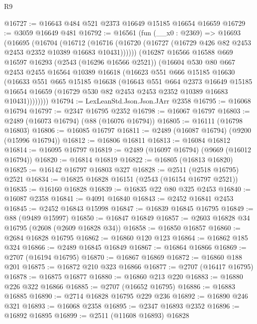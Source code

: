 \begin{lexlean}{R9}
\begin{coremodule}
@16727 := @16643 @484 @521 @2373 @16649 @15185 @16654 @16659
@16729 := @3059 @16649 @481
@16792 := @16561
    (fun (__x0 : @2369) =>
    @16693
      (@16695
        (@16704
          (@16712
            (@16716 (@16720 (@16727 (@16729 @426 @82 @2453 @2453 @2352 @10389 @16683 @10431))))))
        (@16287
          @16566
          @16588
          @669
          @16597
          @16293
          (@2543 (@16296 @16566 @2521))
          (@16604
            @530
            @80
            @667
            @2453
            @2455
            @16564
            @10389
            @16618
            (@16623
              @551
              @666
              @15185
              @16630
              (@16633
                @551
                @665
                @15185
                @16638
                (@16643
                  @551
                  @664
                  @2373
                  @16649
                  @15185
                  @16654
                  @16659
                  (@16729 @530 @82 @2453 @2453 @2352 @10389 @16683 @10431))))))))
@16794 := LexLeanStd.Json.Json.JArr @2358
@16795 := @16068 @16794
@16797 := @2347 @16795 @2352
@16798 := @16067 @16797
@16803 := @2489 (@16073 @16794) (@88 (@16076 @16794))
@16805 := @16111 (@16798 @16803)
@16806 := @16085 @16797
@16811 := @2489 (@16087 @16794) (@9200 (@15996 @16794))
@16812 := @16806 @16811
@16813 := @16084 @16812
@16814 := @16095 @16797
@16819 := @2489 (@16097 @16794) (@9669 (@16012 @16794))
@16820 := @16814 @16819
@16822 := @16805 (@16813 @16820)
@16825 := @16142 @16797 @16803 @327
@16828 := @2511 (@2518 @16795) @2521
@16834 := @16825 @16828 @16151 (@2543 (@16154 @16797 @2521))
@16835 := @16160 @16828
@16839 := @16835 @22 @80 @325 @2453
@16840 := @16087 @2358
@16841 := @4091 @16840
@16843 := @2452 @16841 @2453
@16845 := @2452 @16843 @15998
@16847 := @16839 @16845 @16795
@16849 := @88 (@9489 @15997)
@16850 := @16847 @16849
@16857 := @2603 @16828 @34 @16795 (@2608 (@2609 @16828 @34))
@16858 := @16850 @16857
@16860 := @2684 @16828 @16795
@16862 := @16860 @120 @123
@16864 := @16862 @185 @324
@16866 := @2489 @16845 @16849
@16867 := @16864 @16866
@16869 := @2707 (@16194 @16795)
@16870 := @16867 @16869
@16872 := @16860 @188 @201
@16875 := @16872 @210 @323 @16866
@16877 := @2707 (@16417 @16795)
@16878 := @16875 @16877
@16880 := @16860 @213 @220
@16883 := @16880 @226 @322 @16866
@16885 := @2707 (@16652 @16795)
@16886 := @16883 @16885
@16890 := @2714 @16828 @16795 @229 @236
@16892 := @16890 @246 @321
@16893 := @16068 @2358
@16895 := @2347 @16893 @2352
@16896 := @16892 @16895
@16899 := @2511 (@11608 @16893) @16828

\end{coremodule}
\end{lexlean}
